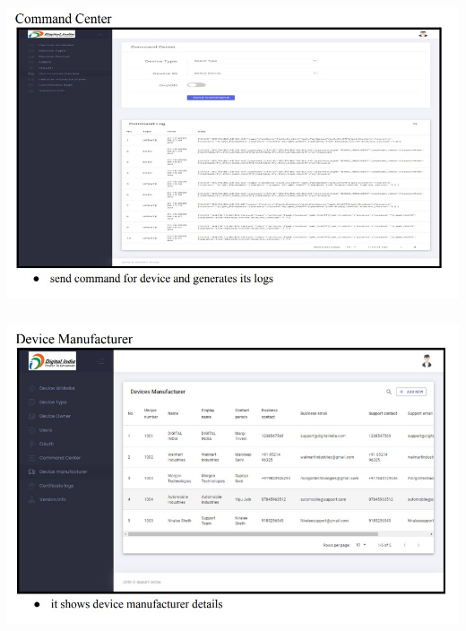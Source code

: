 \begin{center}
\includegraphics[height=9cm,width=14cm]{Admin/Commandcenter.jpg}
\end{center}

\begin{center}
\includegraphics[height=9cm,width=14cm]{Admin/Device.jpg}
\end{center}
\pagebreak

		
		
		
		
		
		
		
		
		
		
		
		
		
		
		
		
		
		
		
		
